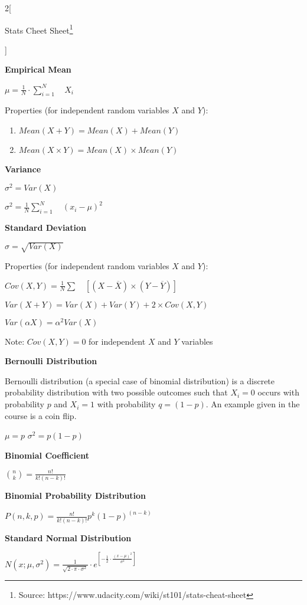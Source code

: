 \documentclass[9pt]{article}
\title{\mytitle}
\date{}
\newcommand{\mytitle}{Stats Cheet Sheet}
\begin{document}
\begin{multicols}{2}[
	\begin{center}
		\mytitle \footnote{Source: https://www.udacity.com/wiki/st101/stats-cheat-sheet}
	\end{center}]

	\textbf{Empirical Mean}
	
	$\mu =\frac{1}{N}\cdot \sum _{i=1}^N\quad X_i$
	
	Properties (for independent random variables $X$ and $Y$):
	\begin{enumerate}
	    \item $Mean(X+Y)=Mean(X)+Mean(Y)$
	   \item  $Mean(X\times Y)=Mean(X)\times Mean(Y)$
	\end{enumerate}
	
	
	\textbf{Variance}
	
	$\sigma^2=Var(X)$
	
	$\sigma^2=\frac{1}{N}\sum_{i=1}^N\quad(x_i-\mu)^2$
	
	
	\textbf{Standard Deviation}
	
	$\sigma=\sqrt{Var(X)}$
	
	Properties (for independent random variables $X$ and $Y$):
	
	$Cov(X,Y)=\frac{1}{N}\sum\quad[(X-\overline{X})\times(Y-\overline{Y})]$
	
	$Var(X+Y)=Var(X)+Var(Y)+2\times Cov(X,Y)$
	
	$Var(\alpha X)=\alpha^2Var(X)$
	
	Note: $Cov(X,Y)=0$ for independent $X$ and $Y$ variables


	\textbf{Bernoulli Distribution}

	Bernoulli distribution (a special case of binomial distribution) is a discrete probability distribution with two possible outcomes such that $X_i=0$ occurs with probability $p$ and $X_i=1$ with probability $q=(1-p)$. An example given in the course is a coin flip.
	
	$\mu=p$ $\sigma^2=p(1-p)$
	

	\textbf{Binomial Coefficient}
	
	${{n}\choose{k}}=\frac{n!}{k!(n-k)!}$
	
	
	\textbf{Binomial Probability Distribution}
	
	$P(n,k,p)=\frac{n!}{k!(n-k)!}p^k(1-p)^{(n-k)}$
	
	
	\textbf{Standard Normal Distribution}
	
	$N(x;\mu,\sigma^2)=\frac{1}{\sqrt{2\cdot\pi\cdot\sigma^2}}\cdot e^{[-\frac{1}{2}\cdot\frac{(x-\mu)^2}{\sigma^2}]}$
	

\end{multicols}
\end{document}
